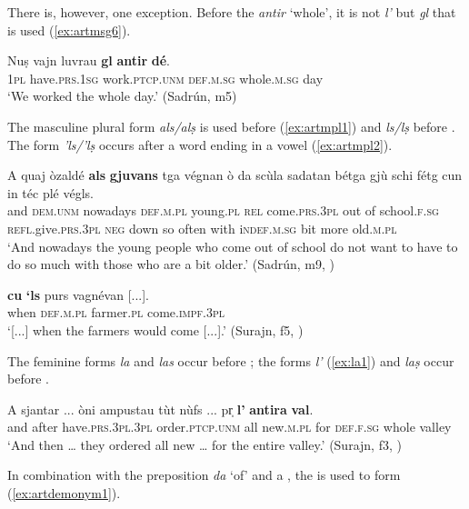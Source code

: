 There is, however, one exception. Before the  \textit{antir} `whole', it is not \textit{l'} but \textit{gl} that is used (\ref{ex:artmsg6}).

\ea\label{ex:artmsg6}
\gll  Nuṣ vajn luvrau \textbf{gl} \textbf{antir} \textbf{dé}.  \\
\textsc{1pl} have.\textsc{prs.1sg} work.\textsc{ptcp.unm} \textsc{def.m.sg} whole.\textsc{m.sg} day\\
\glt `We worked the whole day.' (Sadrún, m5)
\z

The masculine plural form \textit{als/alṣ} is used before  (\ref{ex:artmpl1}) and \textit{ls/lṣ} before . The form \textit{'ls/'lṣ} occurs after a word ending in a vowel (\ref{ex:artmpl2}).

\ea
\label{ex:artmpl1}
\gll A quaj òzaldé \textbf{als} \textbf{gjuvans} tga végnan ò da scùla sadatan bétga gjù schi fétg cun in téc plé végls.   \\
and \textsc{dem.unm} nowadays \textsc{def.m.pl} young.\textsc{pl} \textsc{rel} come.\textsc{prs.3pl} out of school.\textsc{f.sg} \textsc{refl}.give.\textsc{prs.3pl} \textsc{neg} down so often with i\textsc{ndef.m.sg} bit more old.\textsc{m.pl}\\
\glt `And nowadays the young people who come out of school do not want to have to do so much with those who are a bit older.' (Sadrún, m9, )
\z

\ea
\label{ex:artmpl2}
\gll [...] \textbf{cu} \textbf{`ls} purs vagnévan [...].\\
{} when \textsc{def.m.pl} farmer.\textsc{pl} come.\textsc{impf.3pl}\\
\glt `[...] when the farmers would come [...].' (Surajn, f5, )
\z

The feminine forms \textit{la} and \textit{las} occur before ; the forms \textit{l'} (\ref{ex:la1}) and \textit{laṣ} occur before .

\ea\label{ex:la1}
\gll A sjantar ... òni ampustau tùt nùfs ... pr̩ \textbf{l'} \textbf{antira} \textbf{val}.\\
and after {} have.\textsc{prs.3pl.3pl} order.\textsc{ptcp.unm} all new.\textsc{m.pl} {} for \textsc{def.f.sg} whole valley\\
\glt `And then … they ordered all new … for the entire valley.' (Surajn, f3, )
\z

In combination with the preposition \textit{da} ‘of’ and a , the  is used to form  (\ref{ex:artdemonym1}).

